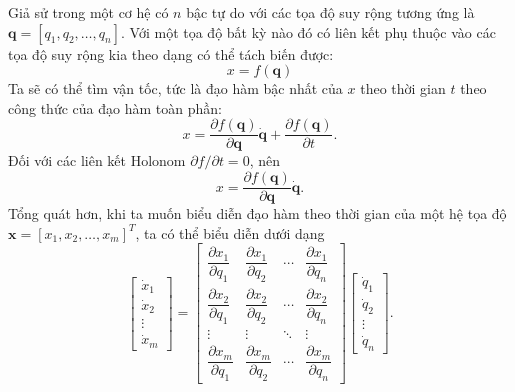 Giả sử trong một cơ hệ có $n$ bậc tự do với các tọa độ suy rộng tương ứng là $\mathbf{q} = [q_1,q_2,\ldots,q_n]$. Với một tọa độ bất kỳ nào đó có liên kết phụ thuộc vào các tọa độ suy rộng kia theo dạng có thể tách biến được:
\begin{equation}
    x = f(\mathbf{q})
\end{equation}
Ta sẽ có thể tìm vận tốc, tức là đạo hàm bậc nhất của $x$ theo thời gian $t$ theo công thức của đạo hàm toàn phần:
\begin{equation}
    x = \dfrac{\partial f(\mathbf{q})}{\partial \mathbf{q}} \mathbf{\dot{q}} + \dfrac{\partial f (\mathbf{q})}{\partial t}.
\end{equation}
Đối với các liên kết Holonom \(\partial f/ \partial t = 0\), nên 
\begin{equation}
    x = \dfrac{\partial f(\mathbf{q})}{\partial \mathbf{q}} \mathbf{\dot{q}}.
\end{equation}
Tổng quát hơn, khi ta muốn biểu diễn đạo hàm theo thời gian của một hệ tọa độ \(\mathbf{x} = \left[ x_1, x_2, \ldots, x_m \right]^T\), ta có thể biểu diễn dưới dạng
\begin{equation} \label{eq:jacobian_coordinate}
    \left[
    \begin{array}{c}
        \dot{x}_1 \\
        \dot{x}_2 \\
        \vdots \\
        \dot{x}_m
    \end{array}
    \right]
    =
    \left[
    \begin{array}{cccc}
        \dfrac{\partial x_1}{\partial q_1} & \dfrac{\partial x_1}{\partial q_2} & \cdots & \dfrac{\partial x_1}{\partial q_n} \\
        \dfrac{\partial x_2}{\partial q_1} & \dfrac{\partial x_2}{\partial q_2} & \cdots & \dfrac{\partial x_2}{\partial q_n} \\
        \vdots & \vdots & \ddots & \vdots \\
        \dfrac{\partial x_m}{\partial q_1} & \dfrac{\partial x_m}{\partial q_2} & \cdots & \dfrac{\partial x_m}{\partial q_n}
    \end{array}
    \right]
    \left[
    \begin{array}{c}
        \dot{q}_1 \\
        \dot{q}_2 \\
        \vdots \\
        \dot{q}_n
    \end{array}
    \right].
\end{equation}
